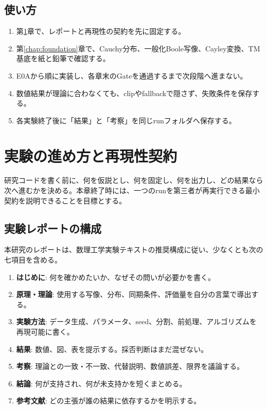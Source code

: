 \documentclass[a4paper,11pt,oneside,openany]{ltjsbook}
\newcommand{\EID}[1]{\textsf{#1}}
\newcommand{\Gate}{\textsf{Gate}}
\begin{document}
\section*{使い方}
\begin{enumerate}
  \item 第\ref{chap:practice}章で、レポートと再現性の契約を先に固定する。
  \item 第\ref{chap:foundation}章で、Cauchy分布、一般化Boole写像、Cayley変換、TM基底を紙と鉛筆で確認する。
  \item \EID{E0A}から順に実装し、各章末の\Gate を通過するまで次段階へ進まない。
  \item 数値結果が理論に合わなくても、clipやfallbackで隠さず、失敗条件を保存する。
  \item 各実験終了後に「結果」と「考察」を同じrunフォルダへ保存する。
\end{enumerate}

\tableofcontents

\mainmatter

\chapter{実験の進め方と再現性契約}
\label{chap:practice}

\begin{purposebox}
研究コードを書く前に、何を仮説とし、何を固定し、何を出力し、どの結果なら次へ進むかを決める。本章終了時には、一つのrunを第三者が再実行できる最小契約を説明できることを目標とする。
\end{purposebox}

\section{実験レポートの構成}

本研究のレポートは、数理工学実験テキストの推奨構成に従い、少なくとも次の七項目を含める\cite{mathlab2024}。

\begin{enumerate}
  \item \textbf{はじめに}: 何を確かめたいか、なぜその問いが必要かを書く。
  \item \textbf{原理・理論}: 使用する写像、分布、同期条件、評価量を自分の言葉で導出する。
  \item \textbf{実験方法}: データ生成、パラメータ、seed、分割、前処理、アルゴリズムを再現可能に書く。
  \item \textbf{結果}: 数値、図、表を提示する。採否判断はまだ混ぜない。
  \item \textbf{考察}: 理論との一致・不一致、代替説明、数値誤差、限界を議論する。
  \item \textbf{結論}: 何が支持され、何が未支持かを短くまとめる。
  \item \textbf{参考文献}: どの主張が誰の結果に依存するかを明示する。
\end{enumerate}
\end{document}
